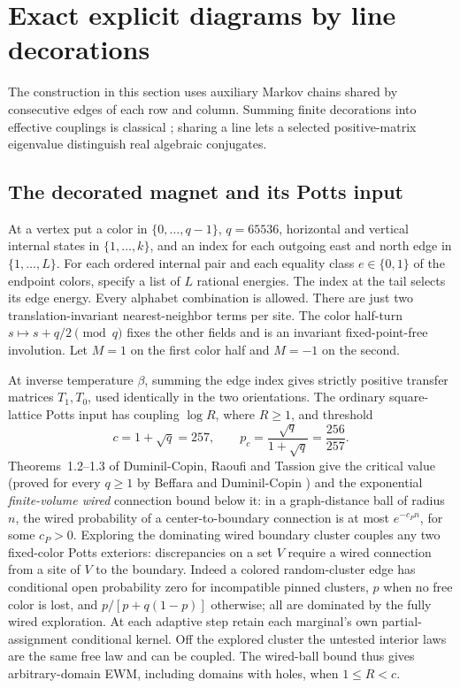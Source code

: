 \section{Exact explicit diagrams by line decorations}\label{sec:algebraic}

The construction in this section uses auxiliary Markov chains shared by consecutive edges of each row and column. Summing finite decorations into effective couplings is classical \cite{syozi,fisher}; sharing a line lets a selected positive-matrix eigenvalue distinguish real algebraic conjugates.

\subsection{The decorated magnet and its Potts input}

At a vertex put a color in \(\{0,\ldots,q-1\}\), \(q=65536\), horizontal and vertical internal states in \(\{1,\ldots,k\}\), and an index for each outgoing east and north edge in \(\{1,\ldots,L\}\). For each ordered internal pair and each equality class \(e\in\{0,1\}\) of the endpoint colors, specify a list of \(L\) rational energies. The index at the tail selects its edge energy. Every alphabet combination is allowed. There are just two translation-invariant nearest-neighbor terms per site. The color half-turn \(s\mapsto s+q/2\pmod q\) fixes the other fields and is an invariant fixed-point-free involution. Let \(M=1\) on the first color half and \(M=-1\) on the second.

At inverse temperature \(\beta\), summing the edge index gives strictly positive transfer matrices \(T_1,T_0\), used identically in the two orientations. The ordinary square-lattice Potts input has coupling \(\log R\), where \(R\ge1\), and threshold
\[
c=1+\sqrt q=257,\qquad p_c=\frac{\sqrt q}{1+\sqrt q}=\frac{256}{257}.
\]
Theorems~1.2--1.3 of Duminil-Copin, Raoufi and Tassion \cite{drt} give the critical value (proved for every \(q\ge1\) by Beffara and Duminil-Copin \cite{bdc}) and the exponential \emph{finite-volume wired} connection bound below it: in a graph-distance ball of radius \(n\), the wired probability of a center-to-boundary connection is at most \(e^{-c_Pn}\), for some \(c_P>0\). Exploring the dominating wired boundary cluster couples any two fixed-color Potts exteriors: discrepancies on a set \(V\) require a wired connection from a site of \(V\) to the boundary. Indeed a colored random-cluster edge has conditional open probability zero for incompatible pinned clusters, \(p\) when no free color is lost, and \(p/[p+q(1-p)]\) otherwise; all are dominated by the fully wired exploration. At each adaptive step retain each marginal's own partial-assignment conditional kernel. Off the explored cluster the untested interior laws are the same free law and can be coupled. The wired-ball bound thus gives arbitrary-domain EWM, including domains with holes, when \(1\le R<c\).

